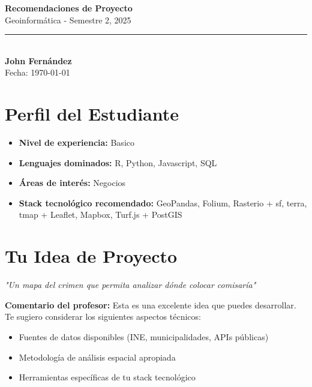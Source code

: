 \documentclass[11pt,a4paper]{article}
\begin{document}
\begin{center}
    {\Huge \textbf{Recomendaciones de Proyecto}}\\[0.5cm]
    {\Large \textcolor{usachblue}{Geoinformática - Semestre 2, 2025}}\\[0.3cm]
    \rule{\textwidth}{0.5pt}\\[0.3cm]
    {\LARGE \textbf{John Fernández}}\\[0.2cm]
    {\large Fecha: \today}
\end{center}

\vspace{0.5cm}

\section*{ Perfil del Estudiante}

\begin{tcolorbox}[colback=blue!5,colframe=usachblue,title=Resumen de tu Perfil]
\begin{itemize}[leftmargin=*]
    \item \textbf{Nivel de experiencia:} Basico
    \item \textbf{Lenguajes dominados:} R, Python, Javascript, SQL
    \item \textbf{Áreas de interés:} Negocios
    \item \textbf{Stack tecnológico recomendado:} GeoPandas, Folium, Rasterio + sf, terra, tmap + Leaflet, Mapbox, Turf.js + PostGIS
\end{itemize}
\end{tcolorbox}


\section*{ Tu Idea de Proyecto}

\begin{tcolorbox}[colback=yellow!10,colframe=darkorange,title=Idea Original]
\textit{"Un mapa del crimen que permita analizar dónde colocar comisaría"}

\vspace{0.3cm}
\textbf{Comentario del profesor:} Esta es una excelente idea que puedes desarrollar. Te sugiero considerar los siguientes aspectos técnicos:
\begin{itemize}
    \item Fuentes de datos disponibles (INE, municipalidades, APIs públicas)
    \item Metodología de análisis espacial apropiada
    \item Herramientas específicas de tu stack tecnológico
\end{itemize}
\end{tcolorbox}
\end{document}
